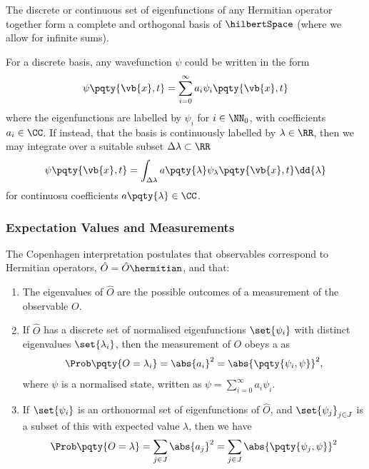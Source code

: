 \begin{theorem}
    The discrete or continuous set of eigenfunctions of any Hermitian operator together form a complete and orthogonal basis of \(\hilbertSpace\) (where we allow for infinite sums).
\end{theorem}

For a discrete basis, any wavefunction \(\psi\) could be written in the form
\begin{equation}
    \psi\pqty{\vb{x}, t} = \sum_{i = 0}^{\infty} a_i \psi_i \pqty{\vb{x}, t}
\end{equation}
where the eigenfunctions are labelled by \(\psi_i\) for \(i \in \NN_0\), with coefficients \(a_i \in \CC\). If instead, that the basis is continuously labelled by \(\lambda \in \RR\), then we may integrate over a suitable subset \(\Delta \lambda \subset \RR\)
\begin{equation}
    \psi\pqty{\vb{x}, t} = \int_{\Delta \lambda} a\pqty{\lambda} \psi_\lambda \pqty{\vb{x}, t} \dd{\lambda}
\end{equation}
for continuosu coefficients \(a \pqty{\lambda} \in \CC\).

\subsubsection{Expectation Values and Measurements}

The Copenhagen interpretation postulates that observables correspond to Hermitian operators, \(\hat{O} = \hat{O}\hermitian\), and that:
\begin{enumerate}
    \item The eigenvalues of \(\hat{O}\) are the possible outcomes of a measurement of the observable \(O\).
    
    \item If \(\hat{O}\) has a discrete set of normalised eigenfunctions \(\set{\psi_i}\) with distinct eigenvalues \(\set{\lambda_i}\), then the measurement of \(O\) obeys a  as
    \begin{equation}
        \Prob\pqty{O = \lambda_i} = \abs{a_i}^2 = \abs{\pqty{\psi_i, \psi}}^2,
    \end{equation}
    where \(\psi\) is a normalised state, written as \(\psi = \sum_{i = 0}^{\infty} a_i \psi_i\).

    \item If \(\set{\psi_i}\) is an orthonormal set of eigenfunctions of \(\hat{O}\), and \(\set{\psi_j}_{j \in J}\) is a subset of this with expected value \(\lambda\), then we have
    \begin{equation}
        \Prob\pqty{O = \lambda} = \sum_{j \in J} \abs{a_j}^2 = \sum_{j \in J} \abs{\pqty{\psi_j, \psi}}^2
    \end{equation}
\end{enumerate}

